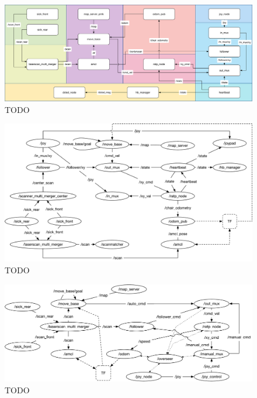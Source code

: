 \begin{landscape}
	\begin{figure}[t]
	\centering
	\includegraphics[width=0.95\textheight]{gfx/pmk/softwarearchitecture}
	\caption{TODO}
	\label{fig:pmk-doc}
	\end{figure}
\end{landscape}

\begin{landscape}
	\begin{figure}[t]
	\centering
	\includegraphics[width=0.95\textheight]{gfx/pmk/hand-graph}
	\caption{TODO}
	\label{fig:pmk-graph}
	\end{figure}
\end{landscape}

\begin{landscape}
	\begin{figure}[t]
	\centering
	\includegraphics[width=0.95\textheight]{gfx/pmk/gen-graph}
	\caption{TODO}
	\label{fig:gen-graph}
	\end{figure}
\end{landscape}

